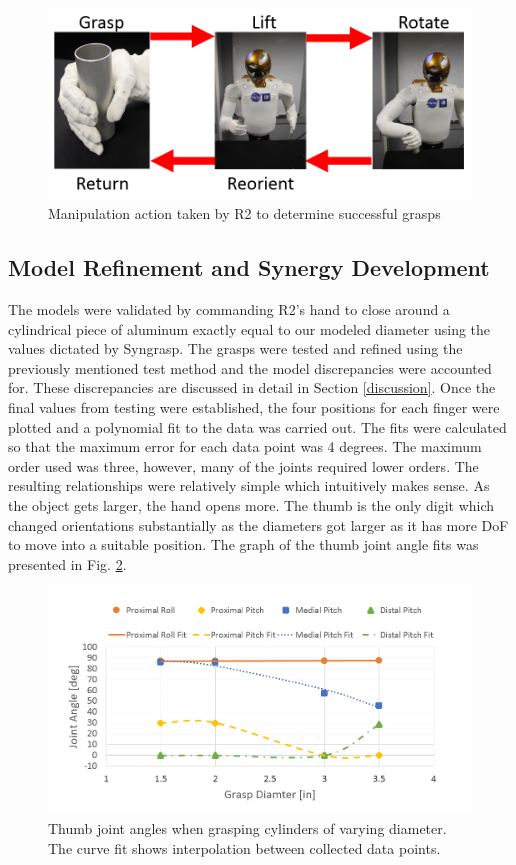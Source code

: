 \documentclass[runningheads,a4paper]{llncs}
\begin{document}
\begin{figure}[]
  \centering
  \includegraphics[width=\linewidth]{manipulation}
  \caption{Manipulation action taken by R2 to determine successful grasps}
  \label{testing}
\end{figure}

\subsection{Model Refinement and Synergy Development}
The models were validated by commanding R2's hand to close around a cylindrical piece of aluminum exactly equal to our modeled diameter using the values dictated by Syngrasp. The grasps were tested and refined using the previously mentioned test method and the model discrepancies were accounted for. These discrepancies are discussed in detail in Section \ref{discussion}. Once the final values from testing were established, the four positions for each finger were plotted and a polynomial fit to the data was carried out. The fits were calculated so that the maximum error for each data point was 4 degrees.   The maximum order used was three, however, many of the joints required lower orders. The resulting relationships were relatively simple which intuitively makes sense. As the object gets larger, the hand opens more. The thumb is the only digit which changed orientations substantially as the diameters got larger as it has more DoF to move into a suitable position. The graph of the thumb joint angle fits was presented in Fig. \ref{thumb_fits}.

\begin{figure}[!b]
  \centering
  \includegraphics[width=1.08\linewidth]{Thumb_Fits_2}
  \caption{Thumb joint angles when grasping cylinders of varying diameter.  The curve fit shows interpolation between collected data points.}
  \label{thumb_fits} 
\end{figure}
\end{document}
